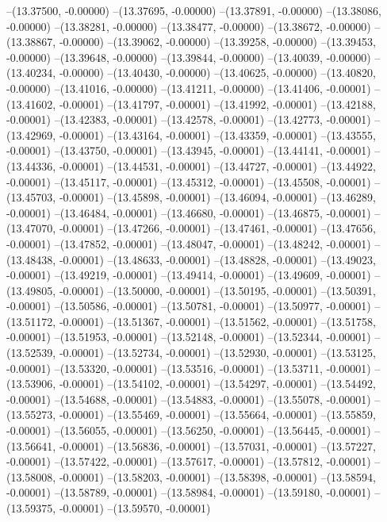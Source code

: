 --(13.37500, -0.00000)
--(13.37695, -0.00000)
--(13.37891, -0.00000)
--(13.38086, -0.00000)
--(13.38281, -0.00000)
--(13.38477, -0.00000)
--(13.38672, -0.00000)
--(13.38867, -0.00000)
--(13.39062, -0.00000)
--(13.39258, -0.00000)
--(13.39453, -0.00000)
--(13.39648, -0.00000)
--(13.39844, -0.00000)
--(13.40039, -0.00000)
--(13.40234, -0.00000)
--(13.40430, -0.00000)
--(13.40625, -0.00000)
--(13.40820, -0.00000)
--(13.41016, -0.00000)
--(13.41211, -0.00000)
--(13.41406, -0.00001)
--(13.41602, -0.00001)
--(13.41797, -0.00001)
--(13.41992, -0.00001)
--(13.42188, -0.00001)
--(13.42383, -0.00001)
--(13.42578, -0.00001)
--(13.42773, -0.00001)
--(13.42969, -0.00001)
--(13.43164, -0.00001)
--(13.43359, -0.00001)
--(13.43555, -0.00001)
--(13.43750, -0.00001)
--(13.43945, -0.00001)
--(13.44141, -0.00001)
--(13.44336, -0.00001)
--(13.44531, -0.00001)
--(13.44727, -0.00001)
--(13.44922, -0.00001)
--(13.45117, -0.00001)
--(13.45312, -0.00001)
--(13.45508, -0.00001)
--(13.45703, -0.00001)
--(13.45898, -0.00001)
--(13.46094, -0.00001)
--(13.46289, -0.00001)
--(13.46484, -0.00001)
--(13.46680, -0.00001)
--(13.46875, -0.00001)
--(13.47070, -0.00001)
--(13.47266, -0.00001)
--(13.47461, -0.00001)
--(13.47656, -0.00001)
--(13.47852, -0.00001)
--(13.48047, -0.00001)
--(13.48242, -0.00001)
--(13.48438, -0.00001)
--(13.48633, -0.00001)
--(13.48828, -0.00001)
--(13.49023, -0.00001)
--(13.49219, -0.00001)
--(13.49414, -0.00001)
--(13.49609, -0.00001)
--(13.49805, -0.00001)
--(13.50000, -0.00001)
--(13.50195, -0.00001)
--(13.50391, -0.00001)
--(13.50586, -0.00001)
--(13.50781, -0.00001)
--(13.50977, -0.00001)
--(13.51172, -0.00001)
--(13.51367, -0.00001)
--(13.51562, -0.00001)
--(13.51758, -0.00001)
--(13.51953, -0.00001)
--(13.52148, -0.00001)
--(13.52344, -0.00001)
--(13.52539, -0.00001)
--(13.52734, -0.00001)
--(13.52930, -0.00001)
--(13.53125, -0.00001)
--(13.53320, -0.00001)
--(13.53516, -0.00001)
--(13.53711, -0.00001)
--(13.53906, -0.00001)
--(13.54102, -0.00001)
--(13.54297, -0.00001)
--(13.54492, -0.00001)
--(13.54688, -0.00001)
--(13.54883, -0.00001)
--(13.55078, -0.00001)
--(13.55273, -0.00001)
--(13.55469, -0.00001)
--(13.55664, -0.00001)
--(13.55859, -0.00001)
--(13.56055, -0.00001)
--(13.56250, -0.00001)
--(13.56445, -0.00001)
--(13.56641, -0.00001)
--(13.56836, -0.00001)
--(13.57031, -0.00001)
--(13.57227, -0.00001)
--(13.57422, -0.00001)
--(13.57617, -0.00001)
--(13.57812, -0.00001)
--(13.58008, -0.00001)
--(13.58203, -0.00001)
--(13.58398, -0.00001)
--(13.58594, -0.00001)
--(13.58789, -0.00001)
--(13.58984, -0.00001)
--(13.59180, -0.00001)
--(13.59375, -0.00001)
--(13.59570, -0.00001)
